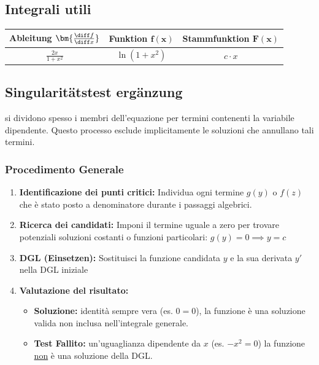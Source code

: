\subsection{Integrali utili}
\begin{center}
    \renewcommand{\arraystretch}{1.6}
    \begin{tabular}{| c  c  c |}
        \hline
        \textbf{Ableitung} $\bm{\frac{\diff f}{\diff x}}$   & \textbf{Funktion} $\bm{f(x)}$ & \textbf{Stammfunktion} $\bm{F(x)}$    \\ 
        \hline
        $\frac{2x}{1+x^2}$              & $\ln(1+x^2)$     & $c \cdot x$                           \\ 
    \end{tabular}
\end{center}

\subsection{Singularitätstest ergänzung}\label{chap:sing_erg}
si dividono spesso i membri dell'equazione per termini contenenti la variabile dipendente. 
Questo processo esclude implicitamente le soluzioni che annullano tali termini.

\subsubsection{Procedimento Generale}

\begin{enumerate}
    \item \textbf{Identificazione dei punti critici:} 
    Individua ogni termine $g(y)$ o $f(z)$ che è stato posto a denominatore durante i passaggi algebrici.
    
    \item \textbf{Ricerca dei candidati:}
    Imponi il termine uguale a zero per trovare potenziali soluzioni 
    costanti o funzioni particolari: $g(y) = 0 \implies y = c $
    
    \item \textbf{DGL (Einsetzen):}
    Sostituisci la funzione candidata $y$ e la sua derivata $y'$ nella DGL iniziale
    
    \item \textbf{Valutazione del risultato:}
    \begin{itemize}
        \item \textbf{Soluzione:} identità sempre vera (es. $0 = 0$), la funzione è una soluzione valida non inclusa nell'integrale generale.
        \item \textbf{Test Fallito:} un'uguaglianza dipendente da $x$ (es. $-x^2 = 0$) la funzione \underline{non} è una soluzione della DGL.
    \end{itemize}
\end{enumerate}